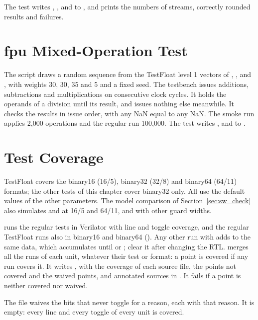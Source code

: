 The test writes , ,  and
 to , and prints the numbers of streams,
correctly rounded results and failures.

\section{fpu Mixed-Operation Test}
\label{sec:mix}

The script  draws a random sequence from the
TestFloat level 1 vectors of , ,  and
, with weights 30, 30, 35 and 5 and a fixed seed. The testbench
 issues additions, subtractions and multiplications on
consecutive clock cycles. It holds the operands of a division until its result,
and issues nothing else meanwhile. It checks the results in issue order, with any
NaN equal to any NaN. The smoke run applies 2,000 operations and the regular run
100,000. The test writes ,  and  to
.

\section{Test Coverage}
\label{sec:coverage}

TestFloat covers the binary16 (16/5), binary32 (32/8) and binary64 (64/11)
formats; the other tests of this chapter cover binary32 only. All use the default
values of the other parameters. The model comparison of
Section~\ref{sec:sw_check} also simulates  and  at 16/5 and
64/11, and  with other guard widths.

 runs the regular tests in Verilator with line and toggle
coverage, and the regular TestFloat runs also in binary16 and binary64
(). Any other run with  adds to the
same data, which accumulates until  or ;
clear it after changing the RTL.  merges all the runs of
each unit, whatever their test or format: a point is covered if any run covers it.
It writes , with the coverage of each source
file, the points not covered and the waived points, and annotated sources in
. It fails if a point is neither covered nor
waived.

The file  waives the bits that never toggle for
a reason, each with that reason. It is empty: every line and every toggle of every
unit is covered.
